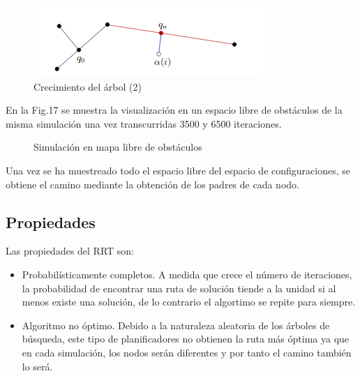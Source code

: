\documentclass[conference]{IEEEtran}
\begin{document}
{\begin{figure}[H]
\centerline{\includegraphics[scale=0.7]{IMAGENES/RRT2.png}}
\caption{Crecimiento del árbol (2)}
\label{fig}
\end{figure}

En la Fig.17 se muestra la visualización en un espacio libre de obstáculos de la misma simulación una vez transcurridas 3500 y 6500 iteraciones.

\begin{figure}[H]
 \centering
 \caption{Simulación en mapa libre de obstáculos}
 \label{f:animales}
\end{figure}

Una vez se ha muestreado todo el espacio libre del espacio de configuraciones, se obtiene el camino mediante  la obtención de los padres de cada nodo.

\subsection{Propiedades}

Las propiedades del RRT son:
\begin{itemize}
\item Probabilísticamente completos. A medida que crece el número de iteraciones, la probabilidad de encontrar una ruta de solución tiende a la unidad si al menos existe una solución, de lo contrario el algortimo se repite para siempre.
\item Algoritmo no óptimo. Debido a la naturaleza aleatoria de los árboles de búsqueda, este tipo de planificadores no obtienen la ruta más óptima ya que en cada simulación, los nodos serán diferentes y por tanto el camino también lo será.
\end{itemize}

}
\end{document}
